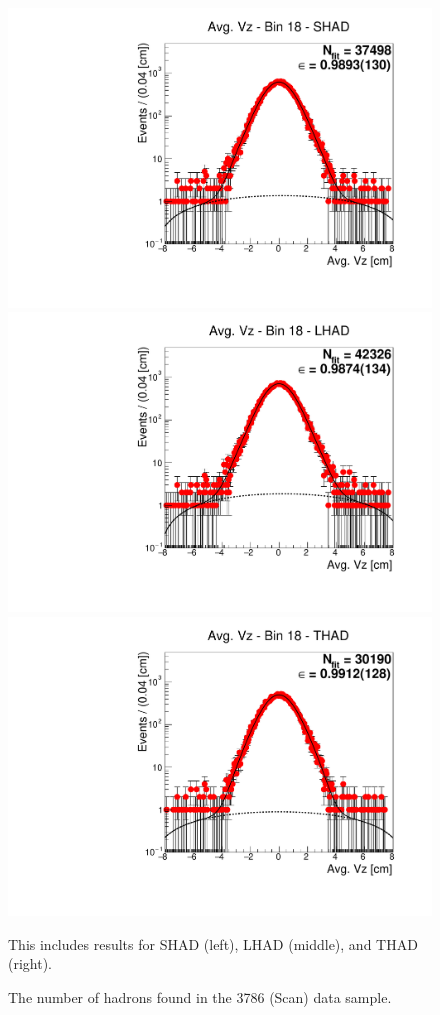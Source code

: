 \begin{figure}[H]
\centering
\includegraphics[scale=0.25]{figures/plots/nonDDbar_fit_results/scan/fit_scan_18_data_SHAD.pdf}
\hspace{-0.5cm}
\includegraphics[scale=0.25]{figures/plots/nonDDbar_fit_results/scan/fit_scan_18_data_LHAD.pdf}
\hspace{-0.5cm}
\includegraphics[scale=0.25]{figures/plots/nonDDbar_fit_results/scan/fit_scan_18_data_THAD.pdf}
\caption{The number of hadrons found in the 3786 (Scan) data sample.}
{This includes results for SHAD (left), LHAD (middle), and THAD (right).}
\label{fig:hadron_fits_scan_18}
\end{figure}


